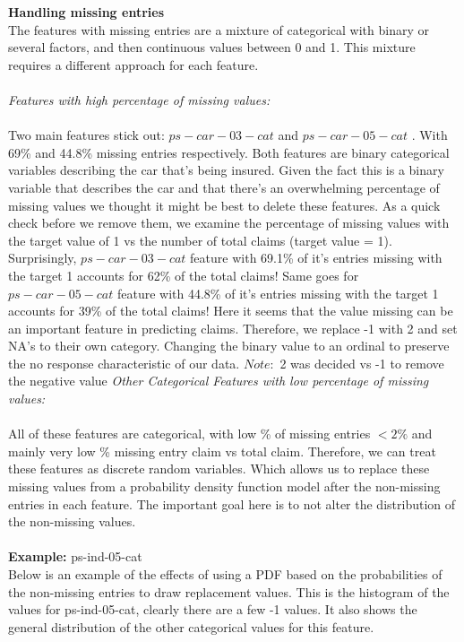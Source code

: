 \documentclass[fleqn,10pt]{SelfArx} %
\begin{document}
\newpage
\textbf{Handling missing entries}\\
The features with missing entries are a mixture of categorical with binary or several factors, and then continuous values between 0 and 1. This mixture requires a different approach for each feature.\\\\
\textit{Features with high percentage of missing values:}\\
\\
Two main features stick out: $ps-car-03-cat$ and $ps-car-05-cat$ . With 69\% and 44.8\% missing entries respectively. Both features are binary categorical variables describing the car that's being insured. Given the fact this is a binary variable that describes the car and that there's an overwhelming percentage of missing values we thought it might be best to delete these features. As a quick check before we remove them, we examine the percentage of missing values with the target value of 1 vs the number of total claims (target value = 1). Surprisingly, $ps-car-03-cat$ feature with 69.1\% of it's entries missing with the target 1 accounts for 62\% of the total claims! Same goes for $ps-car-05-cat$  feature with 44.8\% of it's entries missing with the target 1 accounts for 39\% of the total claims! Here it seems that the value missing can be an important feature in predicting claims. Therefore, we replace -1 with 2 and set NA's to their own category. Changing the binary value to an ordinal to preserve the no response characteristic of our data. $Note:$ 2 was decided vs -1 to remove the negative value
\textit{Other Categorical Features with low percentage of missing values:}\\
\\
All of these features are categorical, with low \% of missing entries \(< 2\%\) and mainly very low \% missing entry claim vs total claim. Therefore, we can treat these features as discrete random variables. Which allows us to replace these missing values from a probability density function model after the non-missing entries in each feature. The important goal here is to not alter the distribution of the non-missing values. \\
\\
\textbf{Example:} ps-ind-05-cat\\
Below is an example of the effects of using a PDF based on the probabilities of the non-missing entries to draw replacement values.
\newpage
This is the histogram of the values for ps-ind-05-cat, clearly there are a few -1 values. It also shows the general distribution of the other categorical values for this feature.\\ 
\end{document}

